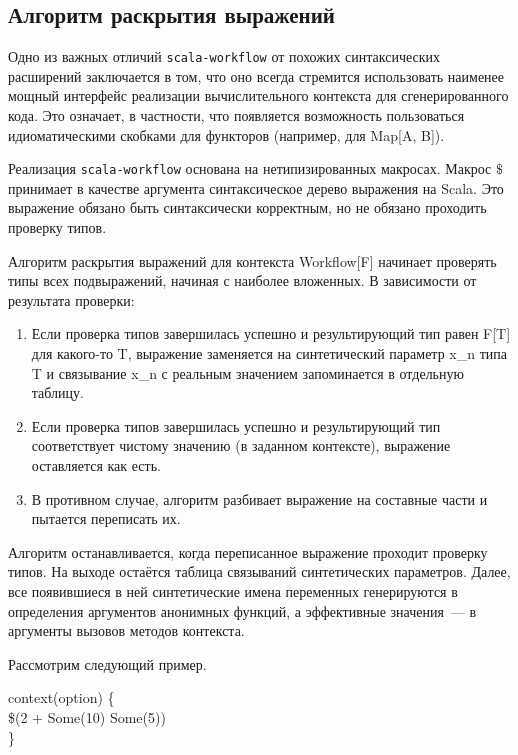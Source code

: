 \subsection{Алгоритм раскрытия выражений}
Одно из важных отличий \texttt{scala-workflow} от похожих синтаксических расширений заключается в том, что оно всегда стремится использовать наименее мощный интерфейс реализации вычислительного контекста для сгенерированного кода. Это означает, в частности, что появляется возможность пользоваться идиоматическими скобками для функторов (например, для \<Map[A, B]\>).

Реализация \texttt{scala-workflow} основана на нетипизированных макросах. Макрос $\$$ принимает в качестве аргумента синтаксическое дерево выражения на Scala. Это выражение обязано быть синтаксически корректным, но не обязано проходить проверку типов.

Алгоритм раскрытия выражений для контекста \<Workflow[F]\> начинает проверять типы всех подвыражений, начиная с наиболее вложенных. В зависимости от результата проверки:
\begin{enumerate}
  \item Если проверка типов завершилась успешно и результирующий тип равен \<F[T]\> для какого-то \<T\>, выражение заменяется на синтетический параметр \<x_n\> типа \<T\> и связывание \<x_n\> с реальным значением запоминается в отдельную таблицу.
  \item Если проверка типов завершилась успешно и результирующий тип соответствует чистому значению (в заданном контексте), выражение оставляется как есть.
  \item В противном случае, алгоритм разбивает выражение на составные части и пытается переписать их.
\end{enumerate}

Алгоритм останавливается, когда переписанное выражение проходит проверку типов. На выходе остаётся таблица связываний синтетических параметров. Далее, все появившиеся в ней синтетические имена переменных генерируются в определения аргументов анонимных функций, а эффективные значения~--- в аргументы вызовов методов контекста.

Рассмотрим следующий пример.

\begin{haskell}
context(option) \{ \\
\quad\quad \$(2  + Some(10) \times Some(5)) \\
\}
\end{haskell}

